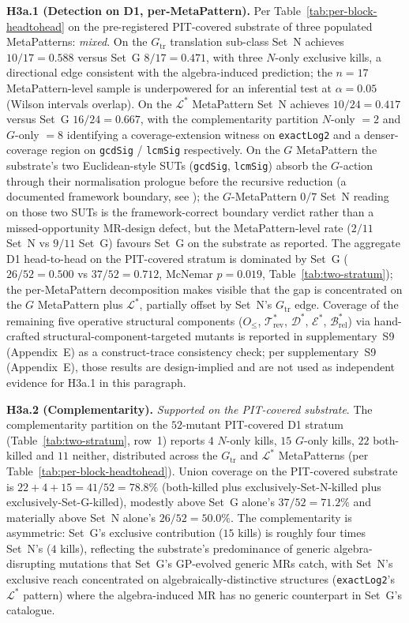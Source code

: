 \documentclass[acmsmall,screen,review]{acmart}
\begin{document}
\textbf{H3a.1 (Detection on D1, per-MetaPattern).} Per
Table~\ref{tab:per-block-headtohead} on the pre-registered
PIT-covered substrate of three populated MetaPatterns: \emph{mixed}. On the
$G_{\mathrm{tr}}$ translation sub-class Set~N achieves $10/17 = 0.588$ versus
Set~G $8/17 = 0.471$, with three $N$-only exclusive kills, a
directional edge consistent with the algebra-induced prediction;
the $n = 17$ MetaPattern-level sample is underpowered for an inferential
test at $\alpha = 0.05$ (Wilson intervals overlap). On the
$\mathcal{L}^{*}$ MetaPattern Set~N achieves $10/24 = 0.417$ versus Set~G
$16/24 = 0.667$, with the complementarity partition $N$-only $= 2$
and $G$-only $= 8$ identifying a coverage-extension witness on
\texttt{exactLog2} and a denser-coverage region on \texttt{gcdSig}
/ \texttt{lcmSig} respectively. On the $G$ MetaPattern the substrate's
two Euclidean-style SUTs (\texttt{gcdSig}, \texttt{lcmSig}) absorb
the $G$-action through their normalisation prologue before the
recursive reduction (a documented framework boundary, see
); the $G$-MetaPattern $0/7$
Set~N reading on those two SUTs is the framework-correct boundary
verdict rather than a missed-opportunity MR-design defect, but the
MetaPattern-level rate ($2/11$ Set~N vs $9/11$ Set~G) favours Set~G on
the substrate as reported. The aggregate D1 head-to-head on the
PIT-covered stratum is dominated by Set~G ($26/52 = 0.500$ vs
$37/52 = 0.712$, McNemar $p = 0.019$,
Table~\ref{tab:two-stratum}); the per-MetaPattern decomposition makes
visible that the gap is concentrated on the $G$ MetaPattern plus
$\mathcal{L}^{*}$, partially offset by Set~N's $G_{\mathrm{tr}}$
edge. Coverage of the remaining five operative structural components ($O_{\le}$,
$\mathcal{T}^{*}_{\mathrm{rev}}$, $\mathcal{D}^{*}$,
$\mathcal{E}^{*}$, $\mathcal{B}^{*}_{\mathrm{rel}}$) via
hand-crafted structural-component-targeted mutants is reported in
supplementary~S9 (Appendix~E) as a construct-trace
consistency check; per supplementary~S9 (Appendix~E), those
results are design-implied and are not used as independent evidence
for H3a.1 in this paragraph.

\textbf{H3a.2 (Complementarity).} \emph{Supported on the PIT-covered
substrate}. The complementarity partition on the $52$-mutant
PIT-covered D1 stratum (Table~\ref{tab:two-stratum}, row~1) reports
$4$ $N$-only kills, $15$ $G$-only kills, $22$ both-killed and $11$
neither, distributed across the $G_{\mathrm{tr}}$ and
$\mathcal{L}^{*}$ MetaPatterns (per
Table~\ref{tab:per-block-headtohead}). Union coverage on the
PIT-covered substrate is $22 + 4 + 15 = 41 / 52 = 78.8\%$
(both-killed plus exclusively-Set-N-killed plus
exclusively-Set-G-killed), modestly above Set~G alone's
$37 / 52 = 71.2\%$ and materially above Set~N alone's
$26 / 52 = 50.0\%$. The complementarity is asymmetric: Set~G's
exclusive contribution ($15$ kills) is roughly four times Set~N's
($4$ kills), reflecting the substrate's predominance of generic
algebra-disrupting mutations that Set~G's GP-evolved generic MRs
catch, with Set~N's exclusive reach concentrated on
algebraically-distinctive structures (\texttt{exactLog2}'s
$\mathcal{L}^{*}$ pattern) where the algebra-induced MR has no
generic counterpart in Set~G's catalogue.
\end{document}
